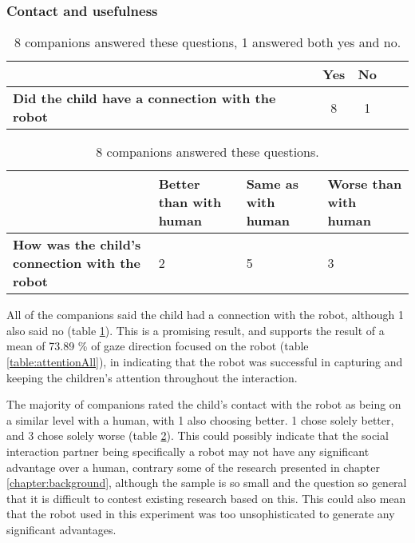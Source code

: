 \subsubsection{Contact and usefulness}

\begin{table}
  \centering
  \renewcommand{\arraystretch}{1.2}
  \begin{tabular}{|p{6cm}|c|c|c|c|}
    \hline
     & 
    \textbf{Yes} &
    \textbf{No} \\\hline
    \textbf{Did the child have a connection with the robot} & 8 & 1\\ \hline
  \end{tabular}
  \caption{8 companions answered these questions, 1 answered both yes and no.}
  \label{table:contactYesNo}
\end{table}


\begin{table}
  \centering
  \renewcommand{\arraystretch}{1.2}
  \begin{tabular}{|p{6cm}|p{2cm}|p{2cm}|p{2cm}|}
    \hline
     & 
    \textbf{Better than with human} &
    \textbf{Same as with human} &
    \textbf{Worse than with human}\\\hline
    \textbf{How was the child's connection with the robot} & 2 & 5 & 3\\ \hline
  \end{tabular}
 
  \caption{8 companions answered these questions.}
  \label{table:contact}
\end{table}


All of the companions said the child had a connection with the robot, although 1 also said no (table \ref{table:contactYesNo}). This is a promising result, and supports the result of a mean of 73.89 \% of gaze direction focused on the robot (table \ref{table:attentionAll}), in indicating that the robot was successful in capturing and keeping the children's attention throughout the interaction.

The majority of companions rated the child's contact with the robot as being on a similar level with a human, with 1 also choosing better. 1 chose solely better, and 3 chose solely worse (table \ref{table:contact}). This could possibly indicate that the social interaction partner being specifically a robot may not have any significant advantage over a human, contrary some of the research presented in chapter \ref{chapter:background}, although the sample is so small and the question so general that it is difficult to contest existing research based on this. This could also mean that the robot used in this experiment was too unsophisticated to generate any significant advantages.

